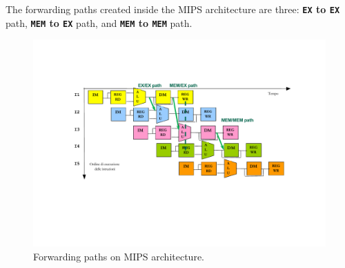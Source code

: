 \documentclass[a4paper]{article}
\begin{document}
    \noindent
    The forwarding paths created inside the MIPS architecture are three: \textbf{\texttt{EX} to \texttt{EX}} path, \textbf{\texttt{MEM} to \texttt{EX}} path, and \textbf{\texttt{MEM} to \texttt{MEM}} path.
    \begin{figure}[!htp]
        \centering
        \includegraphics[width=\textwidth]{img/forwarding-paths-1.pdf}
        \caption{Forwarding paths on MIPS architecture.\cite{pipelining-slides}}
    \end{figure}
\end{document}
